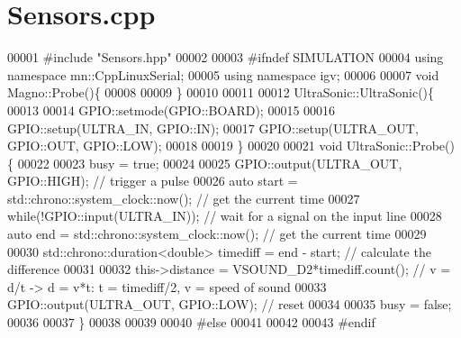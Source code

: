 \hypertarget{Sensors_8cpp_source}{}\section{Sensors.\+cpp}
\label{Sensors_8cpp_source}

\begin{DoxyCode}
00001 \textcolor{preprocessor}{#}\textcolor{preprocessor}{include} \textcolor{preprocessor}{"Sensors.hpp"}
00002 
00003 \textcolor{preprocessor}{#}\textcolor{preprocessor}{ifndef} \textcolor{preprocessor}{SIMULATION}
00004 \textcolor{keyword}{using} \textcolor{keyword}{namespace} mn::CppLinuxSerial;
00005 \textcolor{keyword}{using} \textcolor{keyword}{namespace} igv;
00006 
00007 \textcolor{keywordtype}{void} Magno::Probe()\{
00008 
00009 \}
00010 
00011 
00012 UltraSonic::UltraSonic()\{
00013 
00014     GPIO::setmode(GPIO::BOARD);
00015 
00016     GPIO::setup(ULTRA\_IN, GPIO::IN);
00017     GPIO::setup(ULTRA\_OUT, GPIO::OUT, GPIO::LOW);
00018 
00019 \}
00020 
00021 \textcolor{keywordtype}{void} UltraSonic::Probe() \{
00022 
00023     busy = \textcolor{keyword}{true};
00024 
00025     GPIO::output(ULTRA\_OUT, GPIO::HIGH);  \textcolor{comment}{// trigger a pulse}
00026     \textcolor{keyword}{auto} start = std::chrono::system\_clock::now();  \textcolor{comment}{// get the current time}
00027     \textcolor{keywordflow}{while}(!GPIO::input(ULTRA\_IN));  \textcolor{comment}{// wait for a signal on the input line}
00028     \textcolor{keyword}{auto} end = std::chrono::system\_clock::now();  \textcolor{comment}{// get the current time}
00029 
00030     std::chrono::duration<\textcolor{keywordtype}{double}> timediff = end - start; \textcolor{comment}{// calculate the difference}
00031 
00032     \textcolor{keyword}{this}->distance = VSOUND\_D2*timediff.count(); \textcolor{comment}{// v = d/t -> d = v*t: t = timediff/2, v = speed of
       sound}
00033     GPIO::output(ULTRA\_OUT, GPIO::LOW);  \textcolor{comment}{// reset}
00034 
00035     busy = \textcolor{keyword}{false};
00036 
00037 \}
00038 
00039 
00040 \textcolor{preprocessor}{#}\textcolor{preprocessor}{else}
00041 
00042 
00043 \textcolor{preprocessor}{#}\textcolor{preprocessor}{endif}
\end{DoxyCode}
